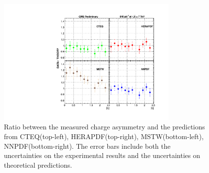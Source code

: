 \begin{figure}[htbp]
  \begin{center}
\includegraphics*[width=0.80\textwidth]{plotCarino}
  \caption{\label{fig:Carino} Ratio between the measured charge asymmetry
and the predictions from CTEQ(top-left), HERAPDF(top-right), MSTW(bottom-left),
NNPDF(bottom-right). The error bars include both the uncertainties on the
experimental results and the uncertainties on theoretical
predictions\cite{bendavid2011electron}.}
  \end{center}
\end{figure}

